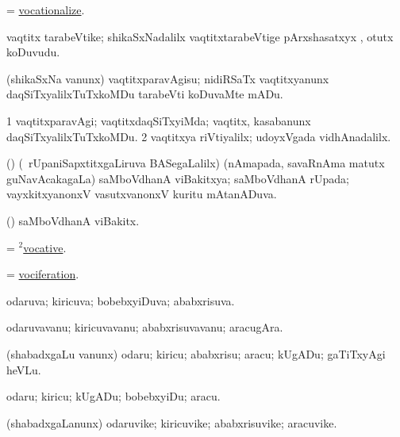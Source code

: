 \bentry
{} 
\gl{\sakirx}
\expl{}
\bmng
 = \hyperlink{vocationalize}{vocationalize}. 
\emng
\eentry

\bentry 
{} 
\gl{\nA}
\expl{}
\bmng
 vaqtitx tarabeVtike; shikaSxNadalilx vaqtitxtarabeVtige pArxshasatxyx , otutx koDuvudu. 
\emng
\eentry

\bentry
{} 
\gl{\sakirx}
\expl{}
\bmng
 (shikaSxNa \mo vanunx) vaqtitxparavAgisu; nidiRSaTx vaqtitxyanunx daqSiTxyalilxTuTxkoMDu tarabeVti koDuvaMte mADu. 
\emng
\eentry

\bentry
{} 
\gl{\kirxvi}
\expl{}
\bmng
\bnum
\num{1} vaqtitxparavAgi; vaqtitxdaqSiTxyiMda; vaqtitx, kasabanunx daqSiTxyalilxTuTxkoMDu. 
\num{2} vaqtitxya riVtiyalilx; udoyxVgada vidhAnadalilx. 
\enum
\emng
\eentry

\bentry
{} 
\gl{\gu}
\expl{}
\bmng
 (\vAyx) (\kanmu\ rUpaniSapxtitxgaLiruva BASegaLalilx) (nAmapada, savaRnAma matutx guNavAcakagaLa) saMboVdhanA viBakitxya; saMboVdhanA rUpada; vayxkitxyanonxV vasutxvanonxV kuritu mAtanADuva. 
\emng
\eentry

\bentry 
{} 
\gl{\nA}
\expl{}
\bmng
 (\vAyx) saMboVdhanA viBakitx. 
\emng
\eentry

\bentry 
{}
\gl{\nA}
\expl{}
\bmng
 = \hyperlink{vocative(2)}{$^2$vocative}. 
\emng
\eentry

\bentry
{} 
\gl{\nA}
\expl{}
\bmng
 = \hyperlink{vociferation}{vociferation}. 
\emng
\eentry

\bentry
{} 
\gl{\gu}
\expl{}
\bmng
 odaruva; kiricuva; bobebxyiDuva; ababxrisuva. 
\emng
\eentry

\bentry
{} 
\gl{\nA}
\expl{}
\bmng
 odaruvavanu; kiricuvavanu; ababxrisuvavanu; aracugAra. 
\emng
\eentry

\bentry
{} 
\gl{\sakirx}
\expl{}
\bmng
 (shabadxgaLu \mo vanunx) odaru; kiricu; ababxrisu; aracu; kUgADu; gaTiTxyAgi heVLu. 
\emng

\noindent 
\gl{\akirx}
\expl{}
\bmng
 odaru; kiricu; kUgADu; bobebxyiDu; aracu. 
\emng
\eentry

\bentry 
{} 
\gl{\nA}
\expl{}
\bmng
 (shabadxgaLanunx) odaruvike; kiricuvike; ababxrisuvike; aracuvike. 
\emng
\eentry

